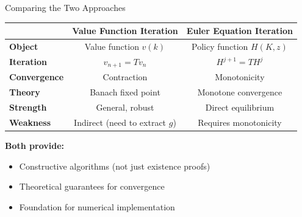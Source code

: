 \documentclass[10pt,english,aspectratio=169]{beamer}
\begin{document}
\begin{frame}{Comparing the Two Approaches}
\begin{center}
\renewcommand{\arraystretch}{1.3}
\begin{tabular}{|l|c|c|}
\hline
 & \textbf{Value Function Iteration} & \textbf{Euler Equation Iteration} \\
\hline
\textbf{Object} & Value function $v(k)$ & Policy function $H(K,z)$ \\
\textbf{Iteration} & $v_{n+1} = Tv_n$ & $H^{j+1} = TH^j$ \\
\textbf{Convergence} & Contraction & Monotonicity \\
\textbf{Theory} & Banach fixed point & Monotone convergence \\
\hline
\textbf{Strength} & General, robust & Direct equilibrium \\
\textbf{Weakness} & Indirect (need to extract $g$) & Requires monotonicity \\
\hline
\end{tabular}
\end{center}

\bigskip
\textbf{Both provide:}
\begin{itemize}
    \item Constructive algorithms (not just existence proofs)
    \item Theoretical guarantees for convergence
    \item Foundation for numerical implementation
\end{itemize}
\end{frame}

\end{document}
